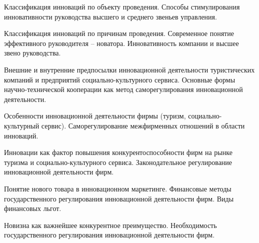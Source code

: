 \documentclass[
	14pt,
	a4paper,
	]
	{scrartcl}
\begin{document}
\vfill
\z Классификация инноваций по объекту проведения.
 \vfill
\z Способы стимулирования инновативности руководства высшего и среднего звеньев управления.
 \vfill

\vfill

\newpage


\shapk
{}
\setcounter{zad}{0}

\vfill
\z Классификация инноваций по причинам проведения.
 \vfill
\z Современное понятие эффективного руководителя – новатора. Инновативность компании и высшее звено руководства.
 \vfill

\vfill

\newpage


\shapk
{}
\setcounter{zad}{0}

\vfill
\z Внешние и внутренние предпосылки инновационной деятельности туристических компаний и предприятий социально-культурного сервиса.
 \vfill
\z Основные формы научно-технической кооперации как метод саморегулирования инновационной деятельности.
 \vfill

\vfill

\newpage


\shapk
{}
\setcounter{zad}{0}

\vfill
\z Особенности инновационной деятельности фирмы (туризм, социально-культурный сервис).
 \vfill
\z Саморегулирование межфирменных отношений в области инноваций.
 \vfill

\vfill

\newpage


\shapk
{}
\setcounter{zad}{0}

\vfill
\z Инновации как фактор повышения конкурентоспособности фирм на рынке туризма и социально-культурного сервиса.
 \vfill
\z Законодательное регулирование инновационной деятельности фирм.
 \vfill

\vfill

\newpage


\shapk
{}
\setcounter{zad}{0}

\vfill
\z Понятие нового товара в инновационном маркетинге.
 \vfill
\z Финансовые методы государственного регулирования инновационной деятельности фирм. Виды финансовых льгот.
 \vfill

\vfill

\newpage


\shapk
{}
\setcounter{zad}{0}

\vfill
\z Новизна как важнейшее конкурентное преимущество.
 \vfill
\z Необходимость государственного регулирования инновационной деятельности фирм.
 \vfill
\end{document}
